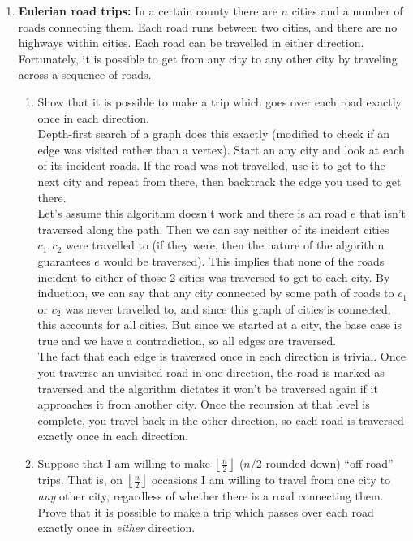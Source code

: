 \documentclass[11pt,fleqn]{article}
\begin{document}
\begin{enumerate}
\newpage
\item \textbf{Eulerian road trips:} In a certain county 
there are $n$ cities
and a number of roads connecting them.
Each road runs between two cities, 
and there are no highways within cities.
Each road can be travelled in either direction.
Fortunately, it is possible to get from any city
to any other city by traveling across a sequence of roads.

\begin{enumerate}

\item Show that it is possible
to make a trip which goes
over each road exactly once in each direction. \\
Depth-first search of a graph does this exactly (modified to check if an edge was visited rather than a vertex). Start an any city and look at each of its incident roads. If the road was not travelled, use it to get to the next city and repeat from there, then backtrack the edge you used to get there. \\
Let's assume this algorithm doesn't work and there is an road $e$ that isn't traversed along the path. Then we can say neither of its incident cities $c_1,c_2$ were travelled to (if they were, then the nature of the algorithm guarantees $e$ would be traversed). This implies that none of the roads incident to either of those 2 cities was traversed to get to each city. By induction, we can say that any city connected by some path of roads to $c_1$ or $c_2$ was never travelled to, and since this graph of cities is connected, this accounts for all cities. But since we started at a city, the base case is true and we have a contradiction, so all edges are traversed. \\
The fact that each edge is traversed once in each direction is trivial. Once you traverse an unvisited road in one direction, the road is marked as traversed and the algorithm dictates it won't be traversed again if it approaches it from another city. Once the recursion at that level is complete, you travel back in the other direction, so each road is traversed exactly once in each direction.
\item Suppose that I am willing to make $\left \lfloor \frac n2 \right \rfloor$ ($n/2$ rounded down)
``off-road'' trips. That is, on $\left \lfloor \frac n2 \right \rfloor$ occasions
I am willing to travel from one city to \emph{any} other city,
regardless of whether there is a road connecting them.
Prove that it is possible to make a trip
which passes over each road exactly once in \emph{either} direction.
\end{enumerate}


\end{enumerate}
\end{document}
